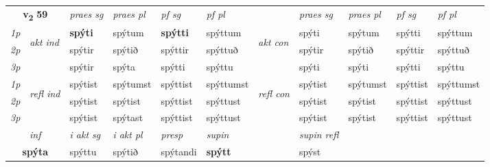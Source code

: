 \noindent
\begin{tabular}{lllllllllll} \toprule
\multicolumn{2}{c}{\textbf{v{\textsubscript{2}}} \Large{\textbf{59}}}  &  \textit{praes sg}  & \textit{praes pl}  &\textit{ pf sg} & \textit{pf pl} &  &  \textit{praes sg}  & \textit{praes pl}  & \textit{pf sg} & \textit{pf pl } \\*
	\cmidrule{3-6} \cmidrule{8-11}
 {\textit{1p}} & \multirow{3}{*}{\begin{turn}{90}\textit{akt ind}\end{turn}} & \textbf{spýti} & spýtum & \textbf{spýtti} & spýttum & \multirow{3}{*}{\begin{turn}{90}\textit{akt con}\end{turn}} &spýti & spýtum & spýtti & spýttum\\*
 {\textit{2p}} &  &  spýtir  & spýtið & spýttir & spýttuð & & spýtir & spýtið & spýttir & spýttuð \\*
{\textit{3p}} &  & spýtir & spýta & spýtti & spýttu & & spýti & spýti& spýtti & spýttu \\*
\cmidrule{3-6} \cmidrule{8-11}
 {\textit{1p}} & \multirow{3}{*}{\begin{turn}{90}\textit{refl ind}\end{turn}}  & spýtist & spýtumst & spýttist & spýttumst & \multirow{3}{*}{\begin{turn}{90}\textit{refl con}\end{turn}}  &spýtist & spýtumst & spýttist & spýttumst \\*
 {\textit{2p}} &  & spýtist & spýtist & spýttist & spýttust & &spýtist & spýtist & spýttist & spýttust \\*
 {\textit{3p}}  & & spýtist & spýtast & spýttist & spýttust & & spýtist & spýtist& spýttist & spýttust \\*
\cmidrule{3-6} \cmidrule{8-11}

   \multicolumn{2}{c}{\textit{inf}}  & \textit{i akt sg} & \textit{i akt pl}   & \textit{presp} & \textit{supin} && \textit{supin refl}  \\*
  \multicolumn{2}{c}{\textbf{spýta}} & spýttu  & spýtið   & spýtandi &  \textbf{spýtt} && spýst  \\*
\end{tabular}

